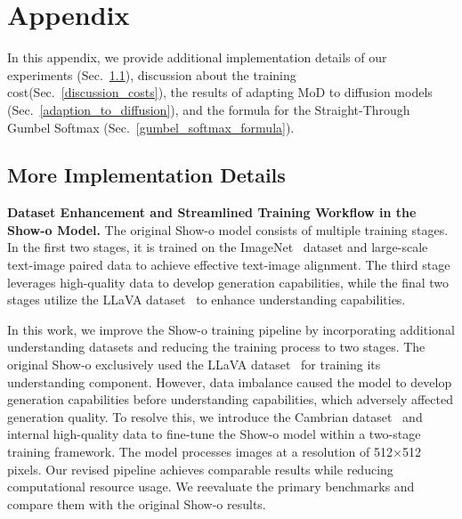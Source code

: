 \section{Appendix}



In this appendix, we provide additional implementation details of our experiments (Sec.~\ref{showo_dataset}), discussion about the training cost(Sec.~\ref{discussion_costs}), the results of adapting MoD to diffusion models (Sec.~\ref{adaption_to_diffusion}), and the formula for the Straight-Through Gumbel Softmax (Sec.~\ref{gumbel_softmax_formula}).



\subsection{More Implementation Details} 
\label{showo_dataset}
\textbf{Dataset Enhancement and Streamlined Training Workflow in the Show-o Model.} The original Show-o model consists of multiple training stages. In the first two stages, it is trained on the ImageNet~\cite{imagenet} dataset and large-scale text-image paired data to achieve effective text-image alignment. The third stage leverages high-quality data to develop generation capabilities, while the final two stages utilize the LLaVA dataset~\cite{llava} to enhance understanding capabilities.

In this work, we improve the Show-o training pipeline by incorporating additional understanding datasets and reducing the training process to two stages. The original Show-o exclusively used the LLaVA dataset~\cite{llava} for training its understanding component. However, data imbalance caused the model to develop generation capabilities before understanding capabilities, which adversely affected generation quality. To resolve this, we introduce the Cambrian dataset~\cite{cambrian} and internal high-quality data to fine-tune the Show-o model within a two-stage training framework. The model processes images at a resolution of 512×512 pixels. Our revised pipeline achieves comparable results while reducing computational resource usage. We reevaluate the primary benchmarks and compare them with the original Show-o results.


